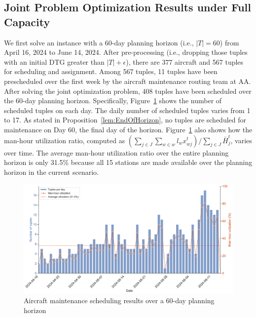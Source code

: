 \subsection{Joint Problem Optimization Results under Full Capacity}
\label{subsection:jp_result}

We first solve an instance with a 60-day planning horizon (i.e., $|T| = 60$) from April 16, 2024 to June 14, 2024. After pre-processing (i.e., dropping those tuples with an initial DTG greater than $|T| + \epsilon$), there are 377 aircraft and 567 tuples for scheduling and assignment. Among 567 tuples, 11 tuples have been prescheduled over the first week by the aircraft maintenance routing team at AA. After solving the joint optimization problem, 408 tuples have been scheduled over the 60-day planning horizon. Specifically, Figure~\ref{fig:60_day_planning_horizon} shows the number of scheduled tuples on each day. 
The daily number of scheduled tuples varies from 1 to 17. As stated in Proposition~\ref{lem:EndOfHorizon}, no tuples are scheduled for maintenance on Day 60, the final day of the horizon. Figure~\ref{fig:60_day_planning_horizon} also shows how the man-hour utilization ratio, 
computed as $\left(\sum_{j \in J}\sum_{w \in w}l_wx_{wj}^t\right) /\sum_{j \in J}\bar{H}_j^t$, varies over time. The average man-hour utilization ratio over the entire planning horizon is only 31.5\% because all 15 stations are made available over the planning horizon in the current scenario. 


\begin{figure}[htbp]
    \centering
    \includegraphics[width=\linewidth]{60_day_check.pdf}
    \caption{Aircraft maintenance scheduling results over a 60-day planning horizon}
    \label{fig:60_day_planning_horizon}
\end{figure}

